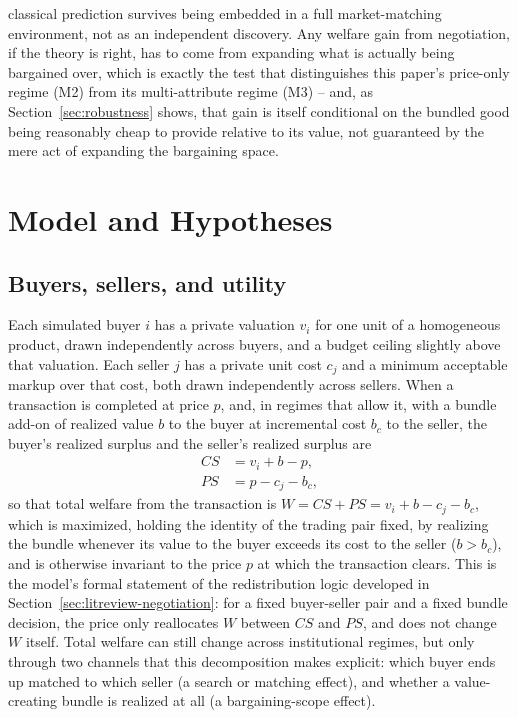 \documentclass[review]{elsarticle}
\begin{document}
classical prediction survives being embedded in a full market-matching environment, not as an independent discovery. Any welfare gain from negotiation, if the theory is right, has to come from expanding what is actually being bargained over, which is exactly the test that distinguishes this paper's price-only regime (M2) from its multi-attribute regime (M3) -- and, as Section~\ref{sec:robustness} shows, that gain is itself conditional on the bundled good being reasonably cheap to provide relative to its value, not guaranteed by the mere act of expanding the bargaining space.

\section{Model and Hypotheses}

\subsection{Buyers, sellers, and utility}
\label{sec:model-utility}

Each simulated buyer $i$ has a private valuation $v_i$ for one unit of a homogeneous product, drawn independently across buyers, and a budget ceiling slightly above that valuation. Each seller $j$ has a private unit cost $c_j$ and a minimum acceptable markup over that cost, both drawn independently across sellers. When a transaction is completed at price $p$, and, in regimes that allow it, with a bundle add-on of realized value $b$ to the buyer at incremental cost $b_c$ to the seller, the buyer's realized surplus and the seller's realized surplus are
\begin{align}
CS &= v_i + b - p, \\
PS &= p - c_j - b_c,
\end{align}
so that total welfare from the transaction is $W = CS + PS = v_i + b - c_j - b_c$, which is maximized, holding the identity of the trading pair fixed, by realizing the bundle whenever its value to the buyer exceeds its cost to the seller ($b > b_c$), and is otherwise invariant to the price $p$ at which the transaction clears. This is the model's formal statement of the redistribution logic developed in Section~\ref{sec:litreview-negotiation}: for a fixed buyer-seller pair and a fixed bundle decision, the price only reallocates $W$ between $CS$ and $PS$, and does not change $W$ itself. Total welfare can still change across institutional regimes, but only through two channels that this decomposition makes explicit: which buyer ends up matched to which seller (a search or matching effect), and whether a value-creating bundle is realized at all (a bargaining-scope effect).
\end{document}
